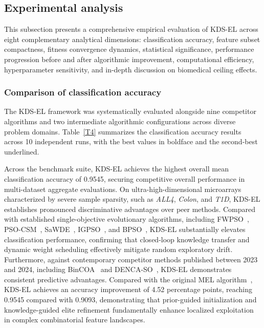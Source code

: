\subsection{Experimental analysis}\label{sec:analysis}

This subsection presents a comprehensive empirical evaluation of KDS-EL across eight complementary analytical dimensions: classification accuracy, feature subset compactness, fitness convergence dynamics, statistical significance, performance progression before and after algorithmic improvement, computational efficiency, hyperparameter sensitivity, and in-depth discussion on biomedical ceiling effects.

\subsubsection{Comparison of classification accuracy}\label{sec:accuracy}

The KDS-EL framework was systematically evaluated alongside nine competitor algorithms and two intermediate algorithmic configurations across diverse problem domains. Table~\ref{T4} summarizes the classification accuracy results across 10 independent runs, with the best values in boldface and the second-best underlined.



Across the benchmark suite, KDS-EL achieves the highest overall mean classification accuracy of 0.9545, securing competitive overall performance in multi-dataset aggregate evaluations. On ultra-high-dimensional microarrays characterized by severe sample sparsity, such as \textit{ALL4}, \textit{Colon}, and \textit{T1D}, KDS-EL establishes pronounced discriminative advantages over peer methods. Compared with established single-objective evolutionary algorithms, including FWPSO~\cite{wangjia2022}, PSO-CSM~\cite{wei2025}, SaWDE~\cite{wang2022}, IGPSO~\cite{xuezhang2024}, and BPSO~\cite{kennedy1997}, KDS-EL substantially elevates classification performance, confirming that closed-loop knowledge transfer and dynamic weight scheduling effectively mitigate random exploratory drift. Furthermore, against contemporary competitor methods published between 2023 and 2024, including BinCOA~\cite{shikoun2024} and DENCA-SO~\cite{hancer2023}, KDS-EL demonstrates consistent predictive advantages. Compared with the original MEL algorithm~\cite{mel2024}, KDS-EL achieves an accuracy improvement of 4.52 percentage points, reaching 0.9545 compared with 0.9093, demonstrating that prior-guided initialization and knowledge-guided elite refinement fundamentally enhance localized exploitation in complex combinatorial feature landscapes.

